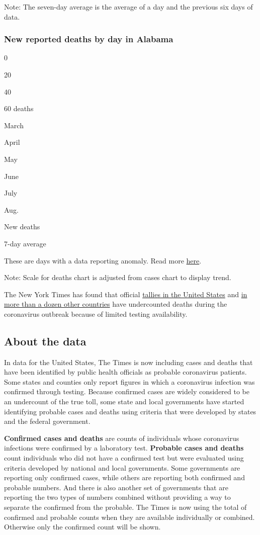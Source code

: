 Note: The seven-day average is the average of a day and the previous six
days of data.

\hypertarget{new-reported-deaths-by-day-in-alabama}{%
\subsubsection{New reported deaths by day in
Alabama}\label{new-reported-deaths-by-day-in-alabama}}

0

20

40

60 deaths

March

April

May

June

July

Aug.

New deaths

7-day average

These are days with a data reporting anomaly. Read more
\protect\hyperlink{anomaly-notes}{here}.

Note: Scale for deaths chart is adjusted from cases chart to display
trend.

The New York Times has found that official
\href{https://www.nytimes.com/interactive/2020/04/28/us/coronavirus-death-toll-total.html}{tallies
in the United States} and
\href{https://www.nytimes.com/interactive/2020/04/21/world/coronavirus-missing-deaths.html}{in
more than a dozen other countries} have undercounted deaths during the
coronavirus outbreak because of limited testing availability.

\hypertarget{about-the-data}{%
\subsection{About the data}\label{about-the-data}}

In data for the United States, The Times is now including cases and
deaths that have been identified by public health officials as probable
coronavirus patients. Some states and counties only report figures in
which a coronavirus infection was confirmed through testing. Because
confirmed cases are widely considered to be an undercount of the true
toll, some state and local governments have started identifying probable
cases and deaths using criteria that were developed by states and the
federal government.

\textbf{Confirmed cases and deaths} are counts of individuals whose
coronavirus infections were confirmed by a laboratory test.
\textbf{Probable cases and deaths} count individuals who did not have a
confirmed test but were evaluated using criteria developed by national
and local governments. Some governments are reporting only confirmed
cases, while others are reporting both confirmed and probable numbers.
And there is also another set of governments that are reporting the two
types of numbers combined without providing a way to separate the
confirmed from the probable. The Times is now using the total of
confirmed and probable counts when they are available individually or
combined. Otherwise only the confirmed count will be shown.

